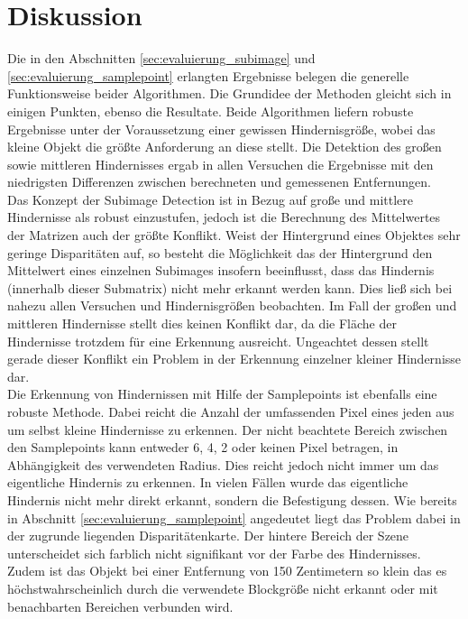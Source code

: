 \section{Diskussion}
\label{sec:evaluation_Diskussion}

Die in den Abschnitten \ref{sec:evaluierung_subimage} und \ref{sec:evaluierung_samplepoint} erlangten Ergebnisse belegen die generelle Funktionsweise beider Algorithmen. Die Grundidee der Methoden gleicht sich in einigen Punkten, ebenso die Resultate. Beide Algorithmen liefern robuste Ergebnisse unter der Voraussetzung einer gewissen Hindernisgröße, wobei das kleine Objekt die größte Anforderung an diese stellt. Die Detektion des großen sowie mittleren Hindernisses ergab in allen Versuchen die Ergebnisse mit den niedrigsten Differenzen zwischen berechneten und gemessenen Entfernungen.\\

\noindent
Das Konzept der Subimage Detection ist in Bezug auf große und mittlere Hindernisse als robust einzustufen, jedoch ist die Berechnung des Mittelwertes der Matrizen auch der größte Konflikt. Weist der Hintergrund eines Objektes sehr geringe Disparitäten auf, so besteht die Möglichkeit das der Hintergrund den Mittelwert eines einzelnen Subimages insofern beeinflusst, dass das Hindernis (innerhalb dieser Submatrix) nicht mehr erkannt werden kann. Dies ließ sich bei nahezu allen Versuchen und Hindernisgrößen beobachten. Im Fall der großen und mittleren Hindernisse stellt dies keinen Konflikt dar, da die Fläche der Hindernisse trotzdem für eine Erkennung ausreicht. Ungeachtet dessen stellt gerade dieser Konflikt ein Problem in der Erkennung einzelner kleiner Hindernisse dar.\\

\noindent
Die Erkennung von Hindernissen mit Hilfe der Samplepoints ist ebenfalls eine robuste Methode. Dabei reicht die Anzahl der umfassenden Pixel eines jeden aus um selbst kleine Hindernisse zu erkennen. Der nicht beachtete Bereich zwischen den Samplepoints kann entweder 6, 4, 2 oder keinen Pixel betragen, in Abhängigkeit des verwendeten Radius. Dies reicht jedoch nicht immer um das eigentliche Hindernis zu erkennen. In vielen Fällen wurde das eigentliche Hindernis nicht mehr direkt erkannt, sondern die Befestigung dessen. Wie bereits in Abschnitt \ref{sec:evaluierung_samplepoint} angedeutet liegt das Problem dabei in der zugrunde liegenden Disparitätenkarte. Der hintere Bereich der Szene unterscheidet sich farblich nicht signifikant vor der Farbe des Hindernisses. Zudem ist das Objekt bei einer Entfernung von 150 Zentimetern so klein das es höchstwahrscheinlich durch die verwendete Blockgröße nicht erkannt oder mit benachbarten Bereichen verbunden wird.\\

